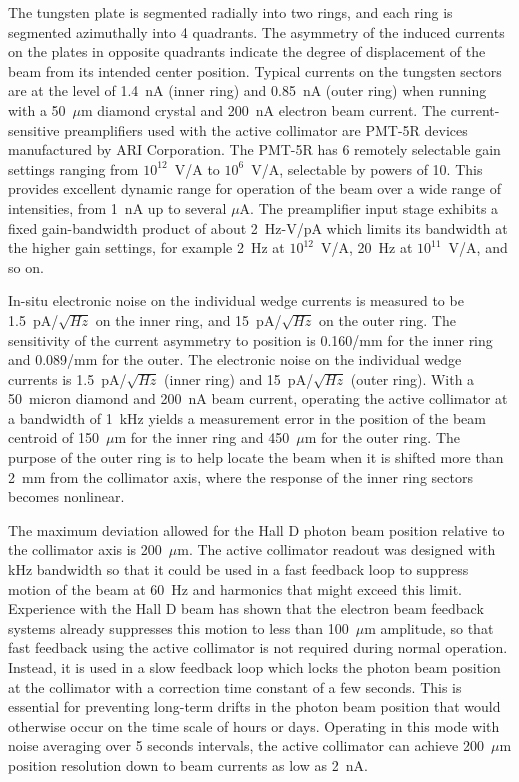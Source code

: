 The tungsten plate is segmented radially into two rings, and each ring is
segmented azimuthally into 4 quadrants. The asymmetry of the induced 
currents on the plates in opposite quadrants indicate the degree of
displacement of the  beam from its intended center position. Typical
currents on the tungsten sectors are at the level of 1.4~nA (inner ring)
and 0.85~nA (outer ring) when running with a 50~$\mu$m diamond crystal
and 200~nA electron beam current. The current-sensitive preamplifiers
used with the active collimator are PMT-5R devices manufactured by
ARI Corporation. The PMT-5R has 6 remotely selectable gain settings
ranging from $10^{12}$~V/A to $10^6$~V/A, selectable by powers of 10.
This provides excellent dynamic
range for operation of the beam over a wide range of intensities, from
1~nA up to several $\mu$A. The preamplifier input stage exhibits a fixed
gain-bandwidth product of about 2~Hz-V/pA which limits its bandwidth at
the higher gain settings, for example 2~Hz at $10^{12}$~V/A, 20~Hz at
$10^{11}$~V/A, and so on.

In-situ electronic noise on the individual wedge currents is measured to
be 1.5~pA/$\sqrt{Hz}$ on the inner ring, and 15~pA/$\sqrt{Hz}$ on the
outer ring. The sensitivity of the current asymmetry to position is
0.160/mm for the inner ring and 0.089/mm for the outer. The electronic
noise on the individual wedge currents is
1.5~pA/$\sqrt{Hz}$ (inner ring) and 15~pA/$\sqrt{Hz}$ (outer ring).
With a 50~micron diamond and 200~nA beam current, operating the active
collimator at a bandwidth of 1~kHz yields a measurement error in the
position of the beam centroid of 150~$\mu$m for the inner ring and
450~$\mu$m for the outer ring.
The purpose of the outer ring is to help locate the beam when it
is shifted more than 2~mm from the collimator axis, where the response
of the inner ring sectors becomes nonlinear.

The maximum deviation allowed for the Hall D photon beam position 
relative to the collimator axis is 200~$\mu$m. The active collimator
readout was designed with kHz bandwidth so that it could be used in a
fast feedback loop to suppress motion of the beam at 60~Hz and harmonics
that might exceed this limit. Experience with the Hall D beam has shown
that the electron beam feedback systems already suppresses this motion
to less than 100~$\mu$m amplitude, so that fast feedback using the active
collimator is not required during normal operation. Instead, it is
used in a slow feedback loop which locks the photon beam position at
the collimator with a correction time constant of a few seconds. This
is essential for preventing long-term drifts in the photon beam
position that would otherwise occur on the time scale of hours or
days. Operating in this mode with noise averaging over 5 seconds intervals,
the  active collimator can achieve 200~$\mu$m position resolution down
to beam currents as low as 2~nA. 

